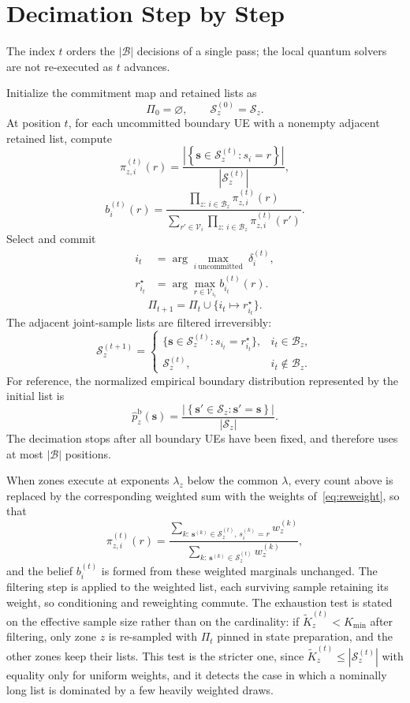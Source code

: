 \documentclass[journal]{IEEEtran}
\newcommand{\calV}{\mathcal{V}}  %
\newcommand{\calB}{\mathcal{B}}  %
\newcommand{\calS}{\mathcal{S}}  %
\begin{document}
\section{Decimation Step by Step}
\label{app:decimation}

The index $t$ orders the $|\calB|$ decisions of a single pass; the local quantum solvers are not re-executed as $t$ advances.

Initialize the commitment map and retained lists as
\[
\Pi_0=\varnothing,
\qquad
\calS_z^{(0)}=\calS_z.
\]
At position $t$, for each uncommitted boundary UE with a nonempty adjacent retained list, compute
\[
\pi_{z,i}^{(t)}(r)=
\frac{\left|\left\{\bm s\in\calS_z^{(t)}:s_i=r\right\}\right|}
{|\calS_z^{(t)}|},
\]
\[
b_i^{(t)}(r)=
\frac{\displaystyle\prod_{z:\,i\in\calB_z}\pi_{z,i}^{(t)}(r)}
{\displaystyle\sum_{r'\in\calV_i}\prod_{z:\,i\in\calB_z}\pi_{z,i}^{(t)}(r')}.
\]
Select and commit
\[
\begin{aligned}
i_t
&=\arg\max_{i\ \text{uncommitted}}\ \delta_i^{(t)},\\
r_{i_t}^{\star}
&=\arg\max_{r\in\calV_{i_t}}b_{i_t}^{(t)}(r).
\end{aligned}
\]
\[
\Pi_{t+1}=\Pi_t\cup\{i_t\mapsto r_{i_t}^{\star}\}.
\]
The adjacent joint-sample lists are filtered irreversibly:
\[
\calS_z^{(t+1)}=
\begin{cases}
\{\bm s\in\calS_z^{(t)}:s_{i_t}=r_{i_t}^{\star}\},
&i_t\in\calB_z,\\
\calS_z^{(t)},
&i_t\notin\calB_z.
\end{cases}
\]
For reference, the normalized empirical boundary distribution represented by the initial list is
\[
\widehat p_z^{\mathrm{b}}(\bm s)=
\frac{\left|\left\{\bm s'\in\calS_z:\bm s'=\bm s\right\}\right|}
{|\calS_z|}.
\]
The decimation stops after all boundary UEs have been fixed, and therefore uses at most $|\calB|$ positions.

When zones execute at exponents $\lambda_z$ below the common $\lambda$, every count above is replaced by the corresponding weighted sum with the weights of~\eqref{eq:reweight}, so that
\[
\pi_{z,i}^{(t)}(r)=
\frac{\sum_{k:\,\bm s^{(k)}\in\calS_z^{(t)},\,s_i^{(k)}=r}w_z^{(k)}}
{\sum_{k:\,\bm s^{(k)}\in\calS_z^{(t)}}w_z^{(k)}},
\]
and the belief $b_i^{(t)}$ is formed from these weighted marginals unchanged. The filtering step is applied to the weighted list, each surviving sample retaining its weight, so conditioning and reweighting commute. The exhaustion test is stated on the effective sample size rather than on the cardinality: if $\widetilde{K}_z^{(t)}<K_{\min}$ after filtering, only zone $z$ is re-sampled with $\Pi_t$ pinned in state preparation, and the other zones keep their lists. This test is the stricter one, since $\widetilde{K}_z^{(t)}\le|\calS_z^{(t)}|$ with equality only for uniform weights, and it detects the case in which a nominally long list is dominated by a few heavily weighted draws.
\end{document}
